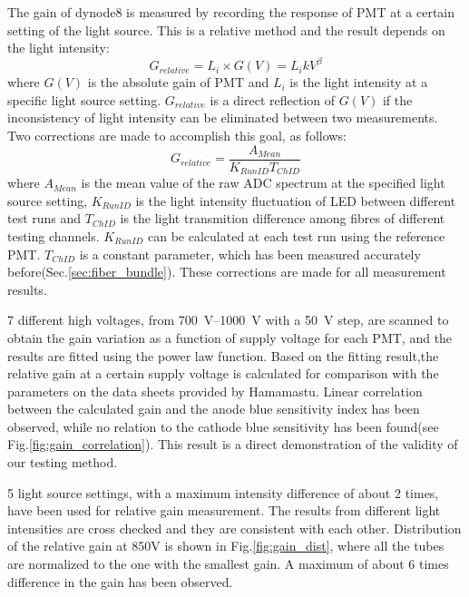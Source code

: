 \documentclass[5p, times]{elsarticle}
\begin{document}
The gain of dynode8 is measured by recording the response of PMT at a certain setting of the light source. 
This is a relative method and the result depends on the light intensity:
\begin{equation}
 G_{relative} = L_i \times G(V) = L_i k V^\beta
 \label{equ:gain}
\end{equation}
where $G(V)$ is the absolute gain of PMT and $L_i$ is the light intensity at a specific light source setting.
$G_{relative}$ is a direct reflection of $G(V)$ if the inconsistency of light intensity can be eliminated between two measurements.
Two corrections are made to accomplish this goal, as follows: 
\begin{equation}
 G_{relative} = \frac{A_{Mean}}{K_{RunID} T_{ChID}}
 \label{equ:correction}
\end{equation} 
where $A_{Mean}$ is the mean value of the raw ADC spectrum at the specified light source setting,
$K_{RunID}$ is the light intensity fluctuation of LED between different test runs and $T_{ChID}$ is the light transmition difference among fibres of different testing channels.
$K_{RunID}$ can be calculated at each test run using the reference PMT.
$T_{ChID}$ is a constant parameter, which has been measured accurately before(Sec.\ref{sec:fiber_bundle}).
These corrections are made for all measurement results.

7 different high voltages, from \SIrange{700}{1000}{\volt} with a \SI{50}{\volt} step, are scanned to obtain the gain variation as a function of supply voltage for each PMT, and the results are fitted using the power law function.
Based on the fitting result,the relative gain at a certain supply voltage is calculated for comparison with the parameters on the data sheets provided by Hamamastu.
Linear correlation between the calculated gain and the anode blue sensitivity index has been observed, while no relation to the cathode blue sensitivity has been found(see Fig.\ref{fig:gain_correlation}).
This result is a direct demonstration of the validity of our testing method.

5 light source settings, with a maximum intensity difference of about 2 times, have been used for relative gain measurement.
The results from different light intensities are cross checked and they are consistent with each other.
Distribution of the relative gain at 850V is shown in Fig.\ref{fig:gain_dist}, where all the tubes are normalized to the one with the smallest gain. 
A maximum of about 6 times difference in the gain has been observed.
\end{document}
